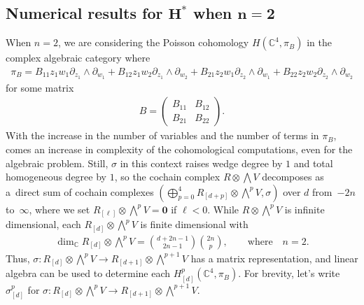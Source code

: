 \documentclass[10pt,a4paper]{amsart}
\numberwithin{equation}{section}
\begin{document}
\subsection[Numerical results for $H^{*}$ when $n=2$]{Numerical results for $\boldsymbol{H^{*}}$ when $\boldsymbol{n=2}$}

When $n=2$, we are considering the Poisson cohomology $H({\mathbb C}^4,\pi_B)$ in the complex algebraic category where
\begin{gather*}
\pi_B=B_{11}z_1w_1\partial_{z_1}\wedge\partial_{w_1}+B_{12}z_1w_2\partial_{z_1}\wedge\partial_{w_2} +B_{21}z_2w_1\partial_{z_2}\wedge\partial_{w_1}+B_{22}z_2w_2\partial_{z_2}\wedge\partial_{w_2}
\end{gather*}
for some matrix
\begin{gather*}
B=\begin{pmatrix}B_{11} & B_{12} \\ B_{21} & B_{22}\end{pmatrix}.
\end{gather*}
With the increase in the number of variables and the number of terms in $\pi_B$, comes an increase in complexity of the cohomological computations, even for the algebraic problem. Still, $\sigma$ in this context raises wedge degree by $1$ and total homogeneous degree by $1$, so the cochain complex $R\otimes \bigwedge V$ decomposes as a~direct sum of cochain complexes $(\bigoplus_{p=0}^{4}R_{[d+p]}\otimes \bigwedge^p V,\sigma)$ over $d$ from~$-2n$ to~$\infty$, where we set $R_{[\ell]}\otimes \bigwedge^p V=\mathbf 0$ if $\ell <0$. While $R\otimes \bigwedge^p V$ is inf\/inite dimensional, each $R_{[d]}\otimes \bigwedge^p V$ is f\/inite dimensional with
\begin{gather*}
\dim_{\mathbb C} R_{[d]}\otimes \textstyle{\bigwedge^p V}= {d+2n-1 \choose 2n-1} {2n\choose p}, \qquad \text{where} \quad n=2.
\end{gather*}
Thus, $\sigma\colon R_{[d]}\otimes \bigwedge^p V\to R_{[d+1]}\otimes \bigwedge^{p+1} V$ has a matrix representation, and linear algebra can be used to determine each $H^p_{[d]}({\mathbb C}^4,\pi_B)$. For brevity, let's write $\sigma^p_{[d]}$ for $\sigma\colon R_{[d]}\otimes \bigwedge^p V\to R_{[d+1]}\otimes \bigwedge^{p+1} V$.
\end{document}
